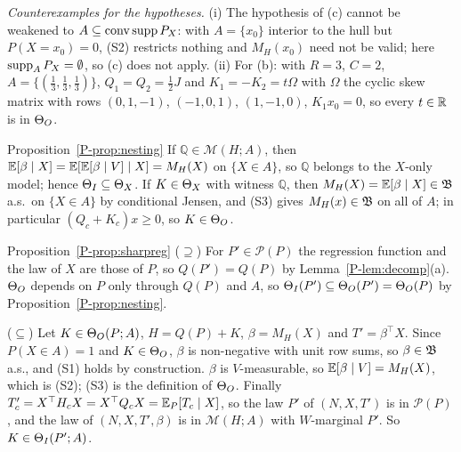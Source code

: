 \emph{Counterexamples for the hypotheses.} (i) The hypothesis of (c) cannot be
weakened to $A\subseteq\operatorname{conv}\operatorname{supp} P_X$: with $A=\{x_0\}$ interior to the hull but
$P(X=x_0)=0$, (S2) restricts nothing and $M_H(x_0)$ need not be valid; here
$\operatorname{supp}_AP_X=\emptyset$, so (c) does not apply. (ii) For (b): with $R=3$, $C=2$,
$A=\{(\tfrac13,\tfrac13,\tfrac13)\}$, $Q_1=Q_2=\tfrac12J$ and $K_1=-K_2=t\Omega$ with
$\Omega$ the cyclic skew matrix with rows $(0,1,-1)$, $(-1,0,1)$, $(1,-1,0)$,
$K_1x_0=0$, so every $t\in\mathbb R$ is in $\Theta_O$.

\begin{proofof}{Proposition~\ref{P-prop:nesting}}
If $\mathbb Q\in\mathcal M(H;A)$, then
$\mathbb E[\beta\mid X]=\mathbb E[\mathbb E[\beta\mid V]\mid X]=M_H(X)$ on $\{X\in A\}$, so $\mathbb Q$ belongs
to the $X$-only model; hence $\Theta_I\subseteq\Theta_X$. If $K\in\Theta_X$ with witness
$\mathbb Q$, then $M_H(X)=\mathbb E[\beta\mid X]\in\mathfrak B$ a.s.\ on $\{X\in A\}$ by conditional
Jensen, and (S3) gives $M_H(x)\in\mathfrak B$ on all of $A$; in particular
$(Q_c+K_c)x\ge0$, so $K\in\Theta_O$.
\end{proofof}

\begin{proofof}{Proposition~\ref{P-prop:sharpreg}}
($\supseteq$) For $P'\in\mathcal P(P)$ the regression function and the law of $X$ are
those of $P$, so $Q(P')=Q(P)$ by Lemma~\ref{P-lem:decomp}(a). $\Theta_O$ depends on $P$
only through $Q(P)$ and $A$, so $\Theta_I(P')\subseteq\Theta_O(P')=\Theta_O(P)$ by
Proposition~\ref{P-prop:nesting}.

($\subseteq$) Let $K\in\Theta_O(P;A)$, $H=Q(P)+K$, $\beta=M_H(X)$ and $T'=\beta^\top X$.
Since $P(X\in A)=1$ and $K\in\Theta_O$, $\beta$ is non-negative with unit row sums, so
$\beta\in\mathfrak B$ a.s., and (S1) holds by construction. $\beta$ is $V$-measurable, so
$\mathbb E[\beta\mid V]=M_H(X)$, which is (S2); (S3) is the definition of $\Theta_O$. Finally
$T'_c=X^\top H_cX=X^\top Q_cX=\mathbb E_P[T_c\mid X]$, so the law $P'$ of $(N,X,T')$ is in
$\mathcal P(P)$, and the law of $(N,X,T',\beta)$ is in $\mathcal M(H;A)$ with
$W$-marginal $P'$. So $K\in\Theta_I(P';A)$.
\end{proofof}


